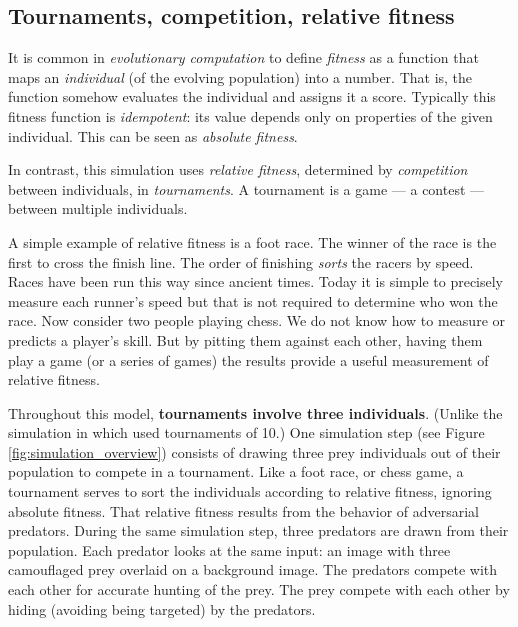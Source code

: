 \documentclass[acmtog]{acmart}
\newcommand{\jargon}[1]{\textit{#1}}
\begin{document}
\subsection{Tournaments, competition, relative fitness}
\label{subsec:tournaments}
It is common in \jargon{evolutionary computation} to define \jargon{fitness} as a function that maps an \jargon{individual} (of the evolving population) into a number. That is, the function somehow evaluates the individual and assigns it a score. Typically this fitness function is \jargon{idempotent}: its value depends only on properties of the given individual. This can be seen as \jargon{absolute fitness}.
\par
In contrast, this simulation uses \jargon{relative fitness}, determined by \jargon{competition} between individuals, in \jargon{tournaments}. A tournament is a game — a contest — between multiple individuals. 
\par
A simple example of relative fitness is a foot race. The winner of the race is the first to cross the finish line. The order of finishing \jargon{sorts} the racers by speed. Races have been run this way since ancient times. Today it is simple to precisely measure each runner's speed but that is not required to determine who won the race. Now consider two people playing chess. We do not know how to measure or predicts a player's skill. But by pitting them against each other, having them play a game (or a series of games) the results provide a useful measurement of relative fitness. 
\par
Throughout this model, \textbf{tournaments involve three individuals}. (Unlike the simulation in \citet{reynolds_iec_2011} which used tournaments of 10.) One simulation step (see Figure \ref{fig:simulation_overview}) consists of drawing three prey individuals out of their population to compete in a tournament. Like a foot race, or chess game, a tournament serves to sort the individuals according to relative fitness, ignoring absolute fitness. That relative fitness results from the behavior of adversarial predators. During the same simulation step, three predators are drawn from their population. Each predator looks at the same input: an image with three camouflaged prey overlaid on a background image. The predators compete with each other for accurate hunting of the prey. The prey compete with each other by hiding (avoiding being targeted) by the predators.
\par

\end{document}
